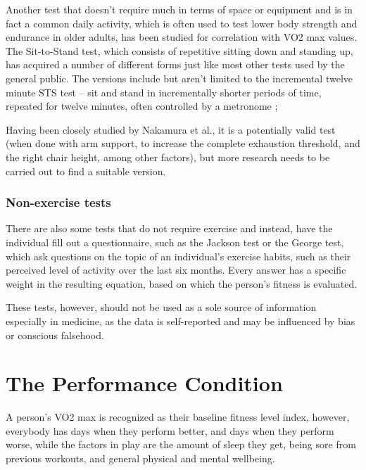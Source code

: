 Another test that doesn't require much in terms of space or equipment and is in fact a common daily activity, which is often used to test lower body strength and endurance in older adults, has been studied for correlation with VO2 max values.
The Sit-to-Stand test, which consists of repetitive sitting down and standing up, has acquired a number of different forms just like most other tests used by the general public.
The versions include but aren't limited to the incremental twelve minute STS test -- sit and stand in incrementally shorter periods of time, repeated for twelve minutes, often controlled by a metronome \cite{seat-height-sit-to-stand};

Having been closely studied by Nakamura et al., it is a potentially valid test (when done with arm support, to increase the complete exhaustion threshold, and the right chair height, among other factors), but more research needs to be carried out to find a suitable version.\cite{frequencies-sit-to-stand}\cite{validity-sit-to-stand}

\subsubsection*{Non-exercise tests}

There are also some tests that do not require exercise and instead, have the individual fill out a questionnaire, such as the Jackson test\cite{nonexercise-vo2max-test-jackson} or the George test\cite{nonexercise-vo2max-test-george},
which ask questions on the topic of an individual's exercise habits, such as their perceived level of activity over the last six months.
Every answer has a specific weight in the resulting equation, based on which the person's fitness is evaluated.

These tests, however, should not be used as a sole source of information especially in medicine, as the data is self-reported and may be influenced by bias or conscious falsehood.

\section{The Performance Condition}

A person's VO2 max is recognized as their baseline fitness level index, however, everybody has days when they perform better, and days when they perform worse, while the factors in play are the amount of sleep they get, being sore from previous workouts, and general physical and mental wellbeing.

